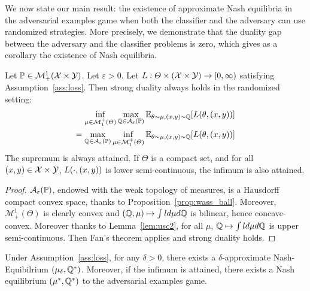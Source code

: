 
We now state our main result: the existence of approximate Nash equilibria in the adversarial examples game when both the classifier and the adversary can use randomized strategies. More precisely, we demonstrate that the duality gap between the adversary and the classifier problems is zero, which gives as a corollary the existence of Nash equilibria. 

\begin{thm}
\label{thm:duality-rand}
Let $\mathbb{P}\in\mathcal{M}^1_+(\mathcal{X}\times\mathcal{Y})$. Let $\varepsilon>0$. Let $L:\Theta\times(\mathcal{X}\times\mathcal{Y})\to [0,\infty)$ satisfying Assumption~\ref{ass:loss}. %
Then strong duality always holds in the randomized  setting:
\begin{align}
 \label{eq:duality}\inf_{\mu\in \mathcal{M}^+_1(\Theta)} \max_{\QQ\in \mathcal{A}_{\varepsilon}(\PP)} \mathbb{E}_{\theta \sim \mu, (x,y)\sim\QQ }\left[\loss(\theta,(x,y))\right]\\
=
\nonumber\max_{\QQ\in \mathcal{A}_{\varepsilon}(\PP)}\inf_{\mu\in \mathcal{M}^+_1(\Theta)}  \mathbb{E}_{\theta \sim \mu, (x,y)\sim\QQ }\left[\loss(\theta,(x,y))\right]
\end{align}
The supremum is always attained. If $\Theta$ is a compact set, and for all $(x,y)\in\mathcal{X}\times\mathcal{Y}$, $L(\cdot,(x,y))$ is lower semi-continuous, the infimum is also attained.
\end{thm}


\begin{proof}
$\mathcal{A}_\varepsilon(\mathbb{P})$, endowed with the weak topology of measures, is a Hausdorff compact convex space, thanks to Proposition~\ref{prop:wass_ball}. Moreover, $\mathcal{M}^1_+(\Theta)$ is clearly convex and $(\mathbb{Q},\mu)\mapsto \int ld\mu d\mathbb{Q}$ is bilinear, hence concave-convex. Moreover thanks to Lemma~\ref{lem:usc2}, for all $\mu$, $\mathbb{Q}\mapsto \int ld\mu d\mathbb{Q}$ is upper semi-continuous. Then Fan's theorem applies and strong duality holds.
\end{proof}
 \begin{corollary}
\label{cor:nash-eq}
Under Assumption~\ref{ass:loss}, for any $\delta>0$, there exists a $\delta$-approximate Nash-Equibilrium $(\mu_\delta,\mathbb{Q}^*)$. Moreover, if the infimum is attained, there exists a Nash equilibrium $(\mu^*,\mathbb{Q}^*)$ to the adversarial examples game.
\end{corollary}



